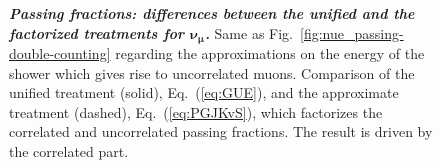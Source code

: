\documentclass[aps,prd,showpacs,letterpaper,onecolumn,longbibliography,superscriptaddress,notitlepage,nofootinbib]{revtex4-1}%
\begin{document}
\begin{figure}
\centering
\caption{\textbf{\textit{Passing fractions: differences between the unified and the factorized treatments for $\boldsymbol{\nu_\mu}$.}} Same as Fig.~\ref{fig:nue_passing-double-counting} regarding the approximations on the energy of the shower which gives rise to uncorrelated muons. Comparison of the unified treatment (solid), Eq.~(\ref{eq:GUE}), and the approximate treatment (dashed), Eq.~(\ref{eq:PGJKvS}), which factorizes the correlated and uncorrelated passing fractions. The result is driven by the correlated part.}
\label{fig:nu-mu-unified-effect}
\end{figure}
\end{document}
